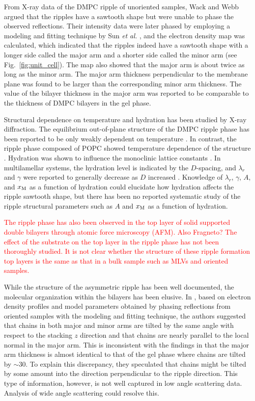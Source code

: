 From X-ray data of the DMPC ripple of unoriented samples, 
Wack and Webb \cite{ref:Wack89} argued that the ripples have a sawtooth shape
but were unable to phase the observed reflections.
Their intensity data were later
phased by employing a modeling and fitting technique by Sun \textit{et al.}
\cite{ref:Sun96}, and the electron density map was calculated, which indicated that  
the ripples indeed have a sawtooth shape with a longer side called the major arm
and a shorter side called the minor arm (see Fig.~\ref{fig:unit_cell}). 
The map also showed that the major arm is about twice as long as the minor arm. 
The major arm thickness perpendicular to the membrane plane 
was found to be larger than the corresponding minor arm thickness. 
The value of the bilayer thickness in the major arm was reported
to be comparable to the thickness of DMPC bilayers in the gel phase.

Structural dependence on temperature and hydration has been studied by X-ray diffraction.
The equilibrium out-of-plane structure of the DMPC ripple phase has been 
reported to be only weakly dependent on temperature \cite{ref:Sengupta03}. 
In contrast, the ripple phase composed of 
\gls{POPC} showed temperature dependence of the structure \cite{ref:Sengupta03}.
Hydration was shown to influence the monoclinic 
lattice constants \cite{ref:Wack89}. In multilamellar systems, the hydration
level is indicated by the $D$-spacing, and 
$\lambda_r$ and $\gamma$ were reported to generally decrease as $D$ increased
\cite{ref:Wack89}.
Knowledge of $\lambda_r$, $\gamma$, $A$, and $x_\textrm{M}$ as a function of hydration 
could elucidate how hydration affects the ripple sawtooth shape, but
there has been no reported systematic study of the ripple structural parameters 
such as $A$ and $x_\textrm{M}$ as a function of hydration.  

\textcolor{red}{
The ripple phase has also been observed in the top layer of 
solid supported double bilayers through atomic force microscopy (AFM).
Also Fragneto?
The effect of the substrate on the top layer in the ripple phase has not been
thoroughly studied. 
It is not clear whether the structure of these ripple formation top layers
is the same as that in a bulk sample such as MLVs and oriented samples.}

While the structure of the asymmetric ripple has been well documented,
the molecular organization within the bilayers has been elusive.
In \cite{ref:Sengupta00,ref:Sengupta03}, based on electron density profiles 
and model parameters obtained by phasing reflections from oriented samples
with the modeling and fitting technique, 
the authors suggested that chains in both major and minor arms are tilted
by the same angle with respect to the stacking $z$ direction and that 
chains are nearly parallel to the local normal in the major arm. 
This is inconsistent with the findings in \cite{ref:Sun96} that
the major arm thickness is almost identical to that of the gel phase where chains 
are tilted by $\sim$30\textdegree. To explain this discrepancy, 
they speculated that chains might be tilted by some amount into the 
direction perpendicular to the ripple direction. 
This type of information, however, is not well captured in low angle scattering data.
Analysis of wide angle scattering could resolve this.

